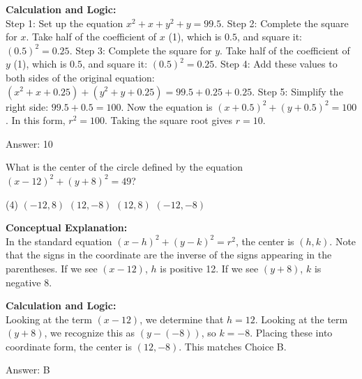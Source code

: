 \documentclass[11pt,paper=a4,answers]{exam}
\begin{document}
\begin{questions}
\begin{solution}
\vspace{30pt}

\textbf{Calculation and Logic:} \\
Step 1: Set up the equation $x^2 + x + y^2 + y = 99.5$. Step 2: Complete the square for $x$. Take half of the coefficient of $x$ (1), which is $0.5$, and square it: $(0.5)^2 = 0.25$. Step 3: Complete the square for $y$. Take half of the coefficient of $y$ (1), which is $0.5$, and square it: $(0.5)^2 = 0.25$. Step 4: Add these values to both sides of the original equation: $(x^2 + x + 0.25) + (y^2 + y + 0.25) = 99.5 + 0.25 + 0.25$. Step 5: Simplify the right side: $99.5 + 0.5 = 100$. Now the equation is $(x + 0.5)^2 + (y + 0.5)^2 = 100$. In this form, $r^2 = 100$. Taking the square root gives $r = 10$.

\vspace{30pt}

Answer: \colorbox{yellow!100}{10}
\end{solution}

\vspace{60pt}

\question
What is the center of the circle defined by the equation $(x - 12)^2 + (y + 8)^2 = 49$?
\begin{tasks}(4)
    \task $(-12, 8)$
    \task $(12, -8)$
    \task $(12, 8)$
    \task $(-12, -8)$
\end{tasks}

\begin{solution}
\textbf{Conceptual Explanation:} \\
In the standard equation $(x - h)^2 + (y - k)^2 = r^2$, the center is $(h, k)$. Note that the signs in the coordinate are the inverse of the signs appearing in the parentheses. If we see $(x - 12)$, $h$ is positive 12. If we see $(y + 8)$, $k$ is negative 8.

\vspace{30pt}

\textbf{Calculation and Logic:} \\
Looking at the term $(x - 12)$, we determine that $h = 12$. Looking at the term $(y + 8)$, we recognize this as $(y - (-8))$, so $k = -8$. Placing these into coordinate form, the center is $(12, -8)$. This matches Choice B.

\vspace{30pt}

Answer: \colorbox{yellow!100}{B}
\end{solution}


\end{questions}
\end{document}
